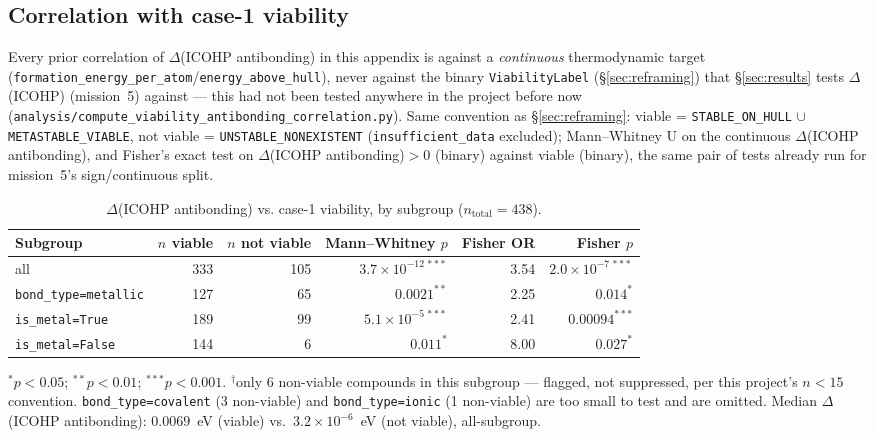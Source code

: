 \documentclass[11pt,a4paper]{article}
\begin{document}
\subsection{Correlation with case-1 viability}
\label{sec:antibonding-viability}

Every prior correlation of $\Delta$(ICOHP antibonding) in this appendix
is against a \emph{continuous} thermodynamic target
(\texttt{formation\_energy\_per\_atom}/\texttt{energy\_above\_hull}),
never against the binary \texttt{ViabilityLabel}
(\S\ref{sec:reframing}) that \S\ref{sec:results} tests
$\Delta$(ICOHP) (mission~5) against --- this had not been tested
anywhere in the project before now
(\texttt{analysis/compute\_viability\_antibonding\_correlation.py}).
Same convention as \S\ref{sec:reframing}: viable
= \texttt{STABLE\_ON\_HULL} $\cup$ \texttt{METASTABLE\_VIABLE}, not
viable = \texttt{UNSTABLE\_NONEXISTENT} (\texttt{insufficient\_data}
excluded); Mann--Whitney U on the continuous $\Delta$(ICOHP
antibonding), and Fisher's exact test on
$\Delta$(ICOHP antibonding)$>0$ (binary) against viable (binary), the
same pair of tests already run for mission~5's sign/continuous split.

\begin{table}[htbp]
\centering
\caption{$\Delta$(ICOHP antibonding) vs. case-1 viability, by subgroup ($n_\text{total}=438$).}
\label{tab:viability-antibonding}
\begin{tabular}{@{}lrrrrr@{}}
\toprule
Subgroup & $n$ viable & $n$ not viable & Mann--Whitney $p$ & Fisher OR & Fisher $p$ \\
\midrule
all                      & 333 & 105 & $3.7\times10^{-12\,***}$ & 3.54 & $2.0\times10^{-7\,***}$ \\
\texttt{bond\_type=metallic} & 127 & 65  & $0.0021^{**}$            & 2.25 & $0.014^{*}$ \\
\texttt{is\_metal=True}      & 189 & 99  & $5.1\times10^{-5\,***}$  & 2.41 & $0.00094^{***}$ \\
\texttt{is\_metal=False}     & 144 & 6\rlap{$^\dagger$}   & $0.011^{*}$              & 8.00 & $0.027^{*}$ \\
\bottomrule
\end{tabular}

\vspace{0.15cm}
{\footnotesize $^{*}p<0.05$; $^{**}p<0.01$; $^{***}p<0.001$.
$^\dagger$only 6 non-viable compounds in this subgroup --- flagged, not
suppressed, per this project's $n<15$ convention.
\texttt{bond\_type=covalent} (3 non-viable) and \texttt{bond\_type=ionic}
(1 non-viable) are too small to test and are omitted. Median
$\Delta$(ICOHP antibonding): $0.0069$~eV (viable) vs.\ $3.2\times10^{-6}$~eV
(not viable), all-subgroup.}
\end{table}
\end{document}
